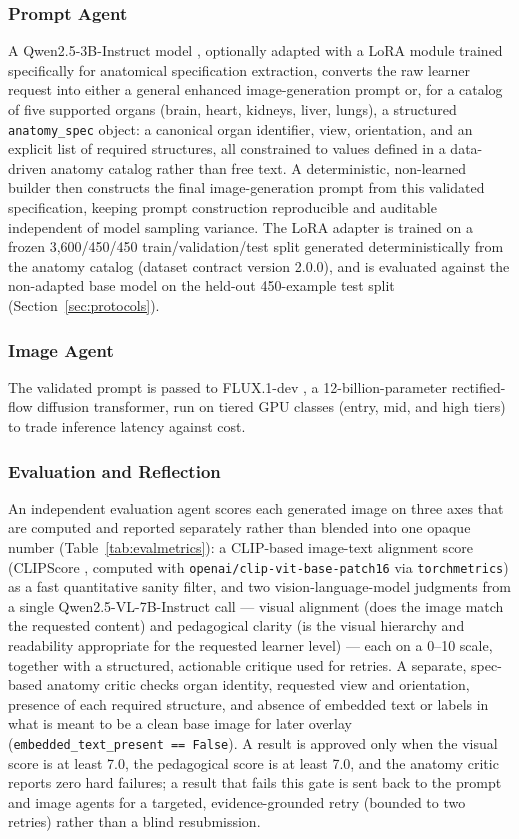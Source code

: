 \documentclass[conference]{IEEEtran}
\begin{document}
\subsubsection{Prompt Agent}
A Qwen2.5-3B-Instruct model \cite{qwen25}, optionally adapted with a LoRA module trained specifically for anatomical specification extraction, converts the raw learner request into either a general enhanced image-generation prompt or, for a catalog of five supported organs (brain, heart, kidneys, liver, lungs), a structured \texttt{anatomy\_spec} object: a canonical organ identifier, view, orientation, and an explicit list of required structures, all constrained to values defined in a data-driven anatomy catalog rather than free text. A deterministic, non-learned builder then constructs the final image-generation prompt from this validated specification, keeping prompt construction reproducible and auditable independent of model sampling variance. The LoRA adapter is trained on a frozen 3{,}600/450/450 train/validation/test split generated deterministically from the anatomy catalog (dataset contract version 2.0.0), and is evaluated against the non-adapted base model on the held-out 450-example test split (Section~\ref{sec:protocols}).

\subsubsection{Image Agent}
The validated prompt is passed to FLUX.1-dev \cite{flux}, a 12-billion-parameter rectified-flow diffusion transformer, run on tiered GPU classes (entry, mid, and high tiers) to trade inference latency against cost.

\subsubsection{Evaluation and Reflection}
An independent evaluation agent scores each generated image on three axes that are computed and reported separately rather than blended into one opaque number (Table~\ref{tab:evalmetrics}): a CLIP-based image-text alignment score (CLIPScore \cite{clipscore}, computed with \texttt{openai/clip-vit-base-patch16} via \texttt{torchmetrics}) as a fast quantitative sanity filter, and two vision-language-model judgments from a single Qwen2.5-VL-7B-Instruct \cite{qwen25vl} call --- visual alignment (does the image match the requested content) and pedagogical clarity (is the visual hierarchy and readability appropriate for the requested learner level) --- each on a 0--10 scale, together with a structured, actionable critique used for retries. A separate, spec-based anatomy critic checks organ identity, requested view and orientation, presence of each required structure, and absence of embedded text or labels in what is meant to be a clean base image for later overlay (\texttt{embedded\_text\_present == False}). A result is approved only when the visual score is at least 7.0, the pedagogical score is at least 7.0, and the anatomy critic reports zero hard failures; a result that fails this gate is sent back to the prompt and image agents for a targeted, evidence-grounded retry (bounded to two retries) rather than a blind resubmission.
\end{document}

